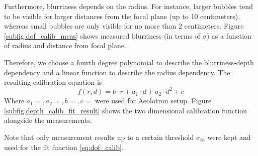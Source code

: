 			Furthermore, blurriness depends on the radius. For instance, larger bubbles tend to be visible for larger distances from the focal plane (up to 10 centimeters), whereas small bubbles are only visible for no more than 2 centimeters. Figure \ref{subfig:dof_calib_meas} shows measured blurriness (in terms of $\sigma$) as a function of radius and distance from focal plane. 
			
			Therefore, we choose a fourth degree polynomial to describe the blurriness-depth dependency and a linear function to describe the radius dependency. The resulting calibration equation is 
			\begin{equation}
				f(r, d) = b \cdot r + a_1 \cdot d + a_2 \cdot d^2 + c
				\label{eq:dof_calib}				
			\end{equation}
			Where $a_1 =, a_2=, b=, c= $ were used for Aeolotron setup. Figure \ref{subfig:depth_calib_fit_result} shows the two dimensional calibration function alongside the measurements. 
			
			Note that only measurement results up to a certain threshold $\sigma_{th}$ were kept and used for the fit function \ref{eq:dof_calib}. 
			
			
			
